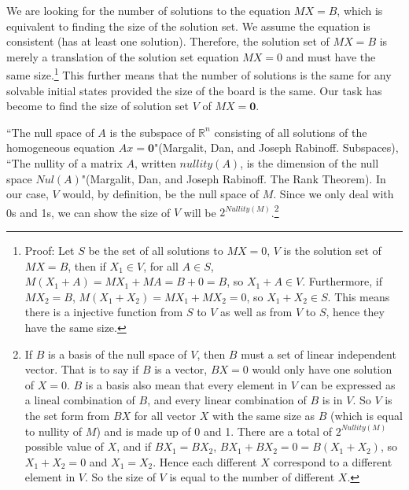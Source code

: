 \documentclass[a4paper, 12pt]{article}
\begin{document}
We are looking for the number of solutions to the equation $MX=B$, which is equivalent to finding the size of the solution set. We assume the equation is consistent (has at least one solution). Therefore, the solution set of $MX=B$ is merely a translation of the solution set equation $MX=0$ and must have the same size.\footnote{ Proof: Let $S$ be the set of all solutions to $MX=0$, $V$ is the solution set of $MX=B$, then if $X_1\in V$, for all $A\in S$, $M(X_1+A)=MX_1+MA=B+0=B$, so $X_1+A\in V$. Furthermore, if $MX_2=B$, $M(X_1+X_2)=MX_1+MX_2=0$, so $X_1+X_2\in S$. This means there is a injective function from $S$ to $V$ as well as from $V$ to $S$, hence they have the same size.} This further means that the number of solutions is the same for any solvable initial states provided the size of the board is the same. Our task has become to find the size of solution set $V$ of $MX=\textbf{0}$.

``The null space of $A$ is the subspace of $\mathbb{R}^n$ consisting of all solutions of the homogeneous equation  $Ax=\textbf{0}$"(Margalit, Dan, and Joseph Rabinoff. Subspaces), ``The nullity of a matrix $A$, written $nullity(A)$, is the dimension of the null space $Nul(A)$"(Margalit, Dan, and Joseph Rabinoff. The Rank Theorem). In our case, $V$ would, by definition, be the null space of $M$. Since we only deal with 0s and 1s, we can show the size of $V$ will be $2^{Nullity(M)}$.\footnote{If $B$ is a basis of the null space of $V$, then $B$ must a set of linear independent vector. That is to say if $B$ is a vector, $BX=0$ would only have one solution of $X=0$. $B$ is a basis also mean that every element in $V$ can be expressed as a lineal combination of $B$, and every linear combination of $B$ is in $V$. So $V$ is the set form from $BX$ for all vector $X$ with the same size as $B$ (which is equal to nullity of $M$) and is made up of 0 and 1. There are a total of $2^{Nullity(M)}$ possible value of $X$, and if $BX_1=BX_2$, $BX_1+BX_2=0=B(X_1+X_2)$, so $X_1+X_2=0$ and $X_1=X_2$. Hence each different $X$ correspond to a different element in $V$. So the size of $V$ is equal to the number of different $X$.}
\end{document}
